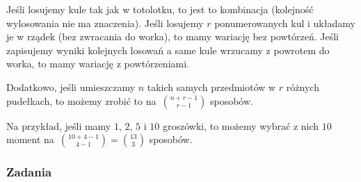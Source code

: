 \documentclass[12pt]{article}
\begin{document}
Jeśli losujemy kule tak jak w totolotku, to jest to kombinacja 
(kolejność wylosowania nie ma znaczenia).
Jeśli losujemy $r$ ponumerowanych kul 
i układamy je w rządek (bez zwracania do worka), to mamy
wariację bez powtórzeń. Jeśli zapisujemy wyniki kolejnych losowań a same kule wrzucamy z powrotem do worka, to mamy
wariację z powtórzeniami.
\bigskip


Dodatkowo, jeśli umieszczamy $n$ takich samych przedmiotów
w $r$ różnych pudełkach, to możemy zrobić to
na~$\binom{n+r-1}{r-1}$ sposobów.

Na przykład, jeśli mamy $1$, $2$, $5$ i $10$ groszówki, 
to możemy wybrać z nich $10$ moment 
na~$\binom{10+4-1}{4-1}=\binom{13}{3}$
sposobów.

\subsubsection{Zadania}
\end{document}
